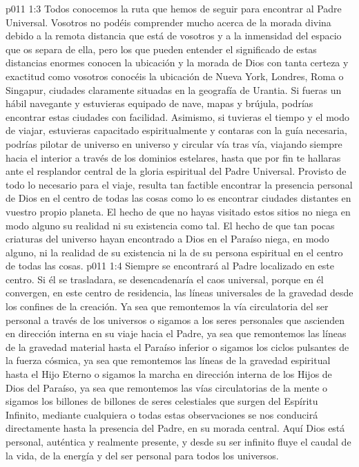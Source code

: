 \vs p011 1:3 \pc Todos conocemos la ruta que hemos de seguir para encontrar al Padre Universal. Vosotros no podéis comprender mucho acerca de la morada divina debido a la remota distancia que está de vosotros y a la inmensidad del espacio que os separa de ella, pero los que pueden entender el significado de estas distancias enormes conocen la ubicación y la morada de Dios con tanta certeza y exactitud como vosotros conocéis la ubicación de Nueva York, Londres, Roma o Singapur, ciudades claramente situadas en la geografía de Urantia. Si fueras un hábil navegante y estuvieras equipado de nave, mapas y brújula, podrías encontrar estas ciudades con facilidad. Asimismo, si tuvieras el tiempo y el modo de viajar, estuvieras capacitado espiritualmente y contaras con la guía necesaria, podrías pilotar de universo en universo y circular vía tras vía, viajando siempre hacia el interior a través de los dominios estelares, hasta que por fin te hallaras ante el resplandor central de la gloria espiritual del Padre Universal. Provisto de todo lo necesario para el viaje, resulta tan factible encontrar la presencia personal de Dios en el centro de todas las cosas como lo es encontrar ciudades distantes en vuestro propio planeta. El hecho de que no hayas visitado estos sitios no niega en modo alguno su realidad ni su existencia como tal. El hecho de que tan pocas criaturas del universo hayan encontrado a Dios en el Paraíso niega, en modo alguno, ni la realidad de su existencia ni la de su persona espiritual en el centro de todas las cosas.
\vs p011 1:4 Siempre se encontrará al Padre localizado en este centro. Si él se trasladara, se desencadenaría el caos universal, porque en él convergen, en este centro de residencia, las líneas universales de la gravedad desde los confines de la creación. Ya sea que remontemos la vía circulatoria del ser personal a través de los universos o sigamos a los seres personales que ascienden en dirección interna en su viaje hacia el Padre, ya sea que remontemos las líneas de la gravedad material hasta el Paraíso inferior o sigamos los ciclos pulsantes de la fuerza cósmica, ya sea que remontemos las líneas de la gravedad espiritual hasta el Hijo Eterno o sigamos la marcha en dirección interna de los Hijos de Dios del Paraíso, ya sea que remontemos las vías circulatorias de la mente o sigamos los billones de billones de seres celestiales que surgen del Espíritu Infinito, mediante cualquiera o todas estas observaciones se nos conducirá directamente hasta la presencia del Padre, en su morada central. Aquí Dios está personal, auténtica y realmente presente, y desde su ser infinito fluye el caudal de la vida, de la energía y del ser personal para todos los universos.
